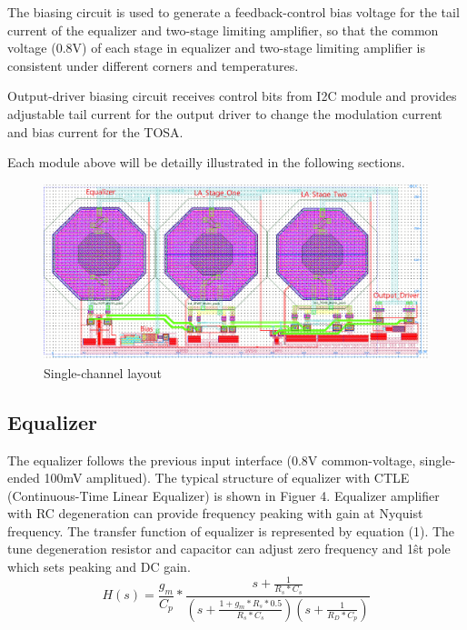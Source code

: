 \documentclass[11pt,a4paper]{article}
\begin{document}
\begin{spacing}{1.25}
The biasing circuit is used to generate a feedback-control bias voltage for the tail current of the equalizer and two-stage limiting amplifier, so that the common voltage (0.8V) of each stage in equalizer and two-stage limiting amplifier is consistent under different corners and temperatures.

Output-driver biasing circuit receives control bits from I2C module and provides adjustable tail current for the output driver to change the modulation current and bias current for the TOSA.

Each module above will be detailly illustrated in the following sections.
\begin{figure}[H]
    \includegraphics[width=\linewidth]{./Img/Layout_Eq_LA_OD_Background.png}
    \caption{Single-channel layout}
\end{figure}

\subsection{Equalizer}

The equalizer follows the previous input interface (0.8V common-voltage, single-ended 100mV amplitued). The typical structure of equalizer with CTLE (Continuous-Time Linear Equalizer) is shown in Figuer 4. Equalizer amplifier with RC degeneration can provide frequency peaking with gain at Nyquist frequency. The transfer function of equalizer is represented by equation (1). The tune degeneration resistor and capacitor can adjust zero frequency and 1\^{st} pole which sets peaking and DC gain.
\begin{equation}
H(s) = \frac{g_m}{C_p} * \frac{s + \frac{1}{R_s * C_s}}{\left(s + \frac{1 + g_m * R_s * 0.5}{R_s * C_s}\right)\left(s + \frac{1}{R_D * C_p}\right)} \tag{1} 
\end{equation}


\end{spacing}
\end{document}
